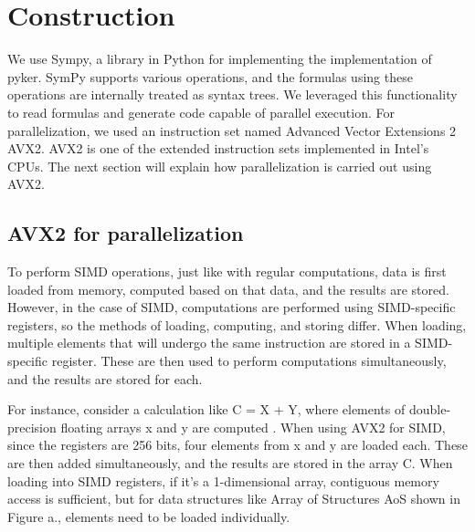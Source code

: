 \documentclass[ams, a4j]{U-AizuGT}
\begin{document}
\section{Construction}
We use Sympy, a library in Python for implementing  the implementation of pyker.
SymPy supports various operations, and the formulas using these operations are internally treated as 
syntax trees. We leveraged this functionality to read formulas and generate code capable of parallel execution.
For parallelization, we used an instruction set named Advanced Vector Extensions 2 \lparen AVX2\rparen. AVX2 is one of the 
extended instruction sets implemented in Intel's CPUs. The next section will explain how parallelization is carried out using AVX2.


\subsection{AVX2 for parallelization}
To perform SIMD operations, just like with regular computations, data is first loaded from memory, computed based on that data,
and the results are stored. However, in the case of SIMD, computations are performed using SIMD-specific registers, so the 
methods of loading, computing, and storing differ. When loading, multiple elements that will undergo the same instruction are
stored in a SIMD-specific register. These are then used to perform computations simultaneously, and the results are stored for
each. 


For instance, consider a calculation like C = X + Y, where elements of double-precision floating arrays x and y are computed
. When using AVX2 for SIMD, since the registers are 256 bits, four elements from x and y are loaded each. These are then added 
simultaneously, and the results are stored in the array C. When loading into SIMD registers, if it's a 1-dimensional array, 
contiguous memory access is sufficient, but for data structures like Array of Structures \lparen AoS \rparen shown in Figure a., elements need
to be loaded individually. 
\end{document}
